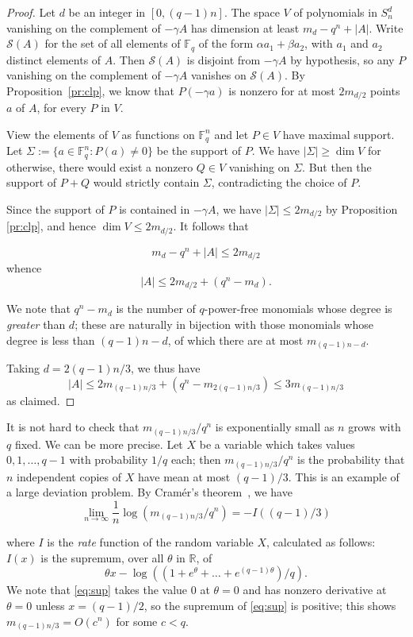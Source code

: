 \documentclass[12pt]{amsart}
\newcommand{\field}[1]{\mathbb{#1}}
\newcommand{\F}{\field{F}}
\newcommand{\R}{\field{R}}
\newcommand{\SSS} {\mathcal{S}}
\newcommand{\ra}{\rightarrow}
\newcommand{\beq}{\begin{displaymath}}
\newcommand{\eeq}{\end{displaymath}}
\theoremstyle{plain}
\theoremstyle{definition}
\theoremstyle{remark}
\begin{document}
\begin{proof}
Let $d$ be an integer in $[0,(q-1)n]$.  The space $V$ of polynomials in $S_n^d$ vanishing on the complement of $-\gamma A$ has dimension at least $m_d - q^n + |A|$.  Write $\SSS(A)$ for the set of all elements of $\F_q$ of the form $\alpha a_1 + \beta a_2$, with $a_1$ and $a_2$ distinct elements of $A$.  Then $\SSS(A)$ is disjoint from $-\gamma A$ by hypothesis, so any $P$ vanishing on the complement of $-\gamma A$ vanishes on $\SSS(A)$.  By Proposition~\ref{pr:clp}, we know that $P(-\gamma a)$ is nonzero for at most $2m_{d/2}$ points $a$ of $A$, for every $P$ in $V$.

%
View the elements of $V$ as functions on $\F_q^n$ and let $P\in V$ have maximal support. Let $\Sigma:=\{a\in \F_q^n : P(a)\neq 0\}$ be the support of $P$. We have $|\Sigma|\geq \dim V$ for otherwise, there would exist a nonzero $Q\in V$ vanishing on $\Sigma$. But then the support of $P+Q$ would strictly contain $\Sigma$, contradicting the choice of $P$. 

Since the support of $P$ is contained in $-\gamma A$, we have $|\Sigma|\leq 2m_{d/2}$ by Proposition \ref{pr:clp}, and hence $\dim V \leq  2m_{d/2}$. It follows that

\beq
m_d - q^n + |A| \leq 2m_{d/2}
\eeq
whence
\beq
|A| \leq 2m_{d/2} + (q^n - m_d).
\eeq

We note that $q^n - m_d$ is the number of $q$-power-free monomials whose degree is {\em greater} than $d$; these are naturally in bijection with those monomials whose degree is less than $(q-1)n-d$, of which there are at most $m_{(q-1)n - d}$.

Taking $d = 2(q-1)n/3$, we thus have
\beq
|A| \leq 2m_{(q-1)n/3} + (q^n - m_{2(q-1)n/3}) \leq 3m_{(q-1)n/3}
\eeq
as claimed.
\end{proof}


It is not hard to check that $m_{(q-1)n/3} / q^n$ is exponentially small as $n$ grows with $q$ fixed.  We can be more precise.  Let $X$ be a variable which takes values $0,1,\ldots,q-1$ with probability $1/q$ each; then $m_{(q-1)n/3} / q^n$ is the probability that $n$ independent copies of $X$ have mean at most $(q-1)/3$.  This is an example of a large deviation problem.  By Cram\'{e}r's theorem~\cite[\S 2.4]{timo}, we have
\beq
\lim_{n \ra \infty} \frac{1}{n} \log (m_{(q-1)n/3} / q^n) = -I((q-1)/3)
\eeq

where $I$ is the {\em rate} function of the random variable $X$, calculated as follows:  $I(x)$ is the supremum, over all $\theta$ in $\R$, of
\begin{equation}
\theta x - \log((1 + e^\theta + \ldots + e^{(q-1)\theta})/q).
\label{eq:sup}
\end{equation}
We note that \eqref{eq:sup} takes the value $0$ at $\theta=0$ and has nonzero derivative at $\theta=0$ unless $x=(q-1)/2$, so the supremum of \eqref{eq:sup} is positive; this shows $m_{(q-1)n/3} = O(c^n)$ for some $c < q$.
\end{document}
